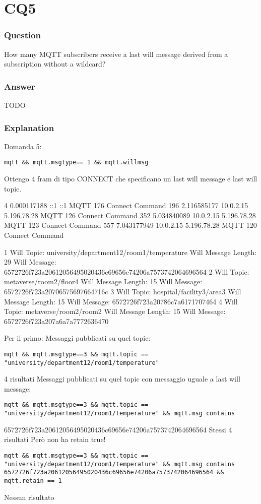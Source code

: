 \section{CQ5}
\subsubsection{Question}
How many MQTT subscribers receive a last will message derived from a subscription without a wildcard?

\subsubsection{Answer}
TODO 

\subsubsection{Explanation}

Domanda 5:

\begin{verbatim}
mqtt && mqtt.msgtype== 1 && mqtt.willmsg
\end{verbatim}
Ottengo 4 fram di tipo CONNECT che specificano un last will message e last will topic.

4	0.000117188	::1	::1	MQTT	176	Connect Command
196	2.116585177	10.0.2.15	5.196.78.28	MQTT	126	Connect Command
352	5.034840089	10.0.2.15	5.196.78.28	MQTT	123	Connect Command
557	7.043177949	10.0.2.15	5.196.78.28	MQTT	120	Connect Command

1
Will Topic: university/department12/room1/temperature
Will Message Length: 29
Will Message: 6572726f723a20612056495020436c69656e74206a7573742064696564
2
Will Topic: metaverse/room2/floor4
Will Message Length: 15
Will Message: 6572726f723a20706575697664716c
3
Will Topic: hospital/facility3/area3
Will Message Length: 15
Will Message: 6572726f723a20786c7a6171707464
4
Will Topic: metaverse/room2/room2
Will Message Length: 15
Will Message: 6572726f723a207a6a7a7772636470

Per il primo:
Messaggi pubblicati su quel topic:
\begin{verbatim}
mqtt && mqtt.msgtype==3 && mqtt.topic == "university/department12/room1/temperature" 
\end{verbatim}
4 risultati
Messaggi pubblicati su quel topic con messaggio uguale a last will message:
\begin{verbatim}
mqtt && mqtt.msgtype==3 && mqtt.topic == "university/department12/room1/temperature" && mqtt.msg contains 
\end{verbatim}
6572726f723a20612056495020436c69656e74206a7573742064696564
Stessi 4 risultati
Però non ha retain true!
\begin{verbatim}
mqtt && mqtt.msgtype==3 && mqtt.topic == "university/department12/room1/temperature" && mqtt.msg contains 
6572726f723a20612056495020436c69656e74206a7573742064696564 && mqtt.retain == 1
\end{verbatim}
Nessun risultato

